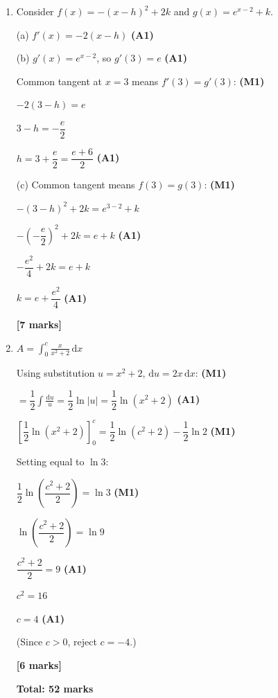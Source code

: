 \documentclass[12pt, twoside]{article}
\begin{document}
\begin{enumerate}[itemsep=0.4cm]
$2 = \sin\!\left(\dfrac{3\pi}{4} - \dfrac{\pi}{4}\right) + c = \sin\dfrac{\pi}{2} + c = 1 + c$

$c = 1$

$y = \sin\!\left(x - \dfrac{\pi}{4}\right) + 1$ \hfill \textbf{(A1)}

\textbf{[4 marks]}

\bigskip

\item Consider $f(x) = -(x-h)^2 + 2k$ and $g(x) = e^{x-2} + k$.

(a) $f'(x) = -2(x - h)$ \hfill \textbf{(A1)}

\medskip
(b) $g'(x) = e^{x-2}$, so $g'(3) = e$ \hfill \textbf{(A1)}

Common tangent at $x = 3$ means $f'(3) = g'(3)$: \hfill \textbf{(M1)}

$-2(3 - h) = e$

$3 - h = -\dfrac{e}{2}$

$h = 3 + \dfrac{e}{2} = \dfrac{e + 6}{2}$ \hfill \textbf{(A1)}

\medskip
(c) Common tangent means $f(3) = g(3)$: \hfill \textbf{(M1)}

$-(3 - h)^2 + 2k = e^{3-2} + k$

$-\left(-\dfrac{e}{2}\right)^2 + 2k = e + k$ \hfill \textbf{(A1)}

$-\dfrac{e^2}{4} + 2k = e + k$

$k = e + \dfrac{e^2}{4}$ \hfill \textbf{(A1)}

\textbf{[7 marks]}

\bigskip

\item $\displaystyle A = \int_0^c \frac{x}{x^2 + 2}\,\mathrm{d}x$

Using substitution $u = x^2 + 2$, $\mathrm{d}u = 2x\,\mathrm{d}x$: \hfill \textbf{(M1)}

$= \dfrac{1}{2}\displaystyle\int \frac{\mathrm{d}u}{u} = \dfrac{1}{2}\ln|u| = \dfrac{1}{2}\ln(x^2 + 2)$ \hfill \textbf{(A1)}

$\left[\dfrac{1}{2}\ln(x^2 + 2)\right]_0^c = \dfrac{1}{2}\ln(c^2 + 2) - \dfrac{1}{2}\ln 2$ \hfill \textbf{(M1)}

Setting equal to $\ln 3$:

$\dfrac{1}{2}\ln\!\left(\dfrac{c^2 + 2}{2}\right) = \ln 3$ \hfill \textbf{(M1)}

$\ln\!\left(\dfrac{c^2 + 2}{2}\right) = \ln 9$

$\dfrac{c^2 + 2}{2} = 9$ \hfill \textbf{(A1)}

$c^2 = 16$

$c = 4$ \hfill \textbf{(A1)}

(Since $c > 0$, reject $c = -4$.)

\textbf{[6 marks]}

\bigskip
\textbf{Total: 52 marks}

\end{enumerate}
\end{document}
